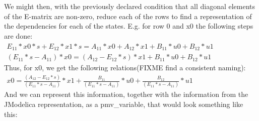 \documentclass{report}
\begin{document}
We might then, with the previously declared condition that all diagonal elements of the E-matrix are non-zero, reduce each of the rows to find a representation of the dependencies for each of the states. E.g. for row 0 and x0 the following steps are done:\\\newline$\begin{array}{rcl} E_{11}*x0*s  +E_{12}*x1*s=A_{11}*x0  +A_{12}*x1 +B_{11}*u0  +B_{12}*u1 \end{array}$\newline
$\begin{array}{rcl} (E_{11}*s-A_{11})*x0  =(A_{12}-E_{12}*s)*x1 +B_{11}*u0  +B_{12}*u1 \end{array}$\\\newline
Thus, for x0, we get the following relations(FIXME find a consistent naming):\\\newline
$\begin{array}{rcl} x0  = \frac{(A_{12}-E_{12}*s)}{(E_{11}*s-A_{11})}*x1 +\frac{B_{11}}{(E_{11}*s-A_{11})}*u0  +\frac{B_{12}}{(E_{11}*s-A_{11})}*u1 \end{array}$\\\newline
And we can represent this information, together with the information from the JModelica representation, as a pmv\_variable, that would look something like this:\\\newline
\setlength\fboxsep{0pt}
\setlength\fboxrule{0.5pt}
\\\newline
\end{document}
